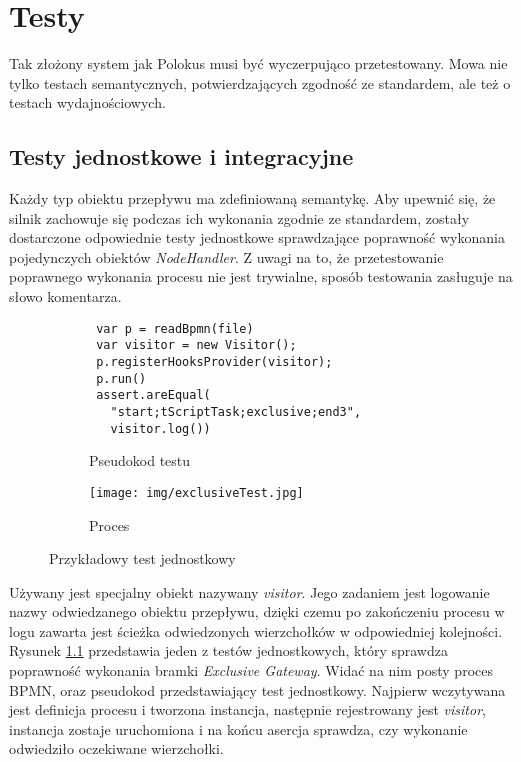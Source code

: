 \documentclass[declaration,shortabstract,mgr]{iithesis}
\newcommand{\bpmnnospace}{BPMN}
\begin{document}
\chapter{Testy}\label{chapter-tests}
Tak złożony system jak Polokus musi być wyczerpująco przetestowany. Mowa nie tylko testach semantycznych, potwierdzających zgodność ze standardem, ale też o testach wydajnościowych.

\section{Testy jednostkowe i integracyjne}
Każdy typ obiektu przepływu ma zdefiniowaną semantykę. Aby upewnić się, że silnik zachowuje się podczas ich wykonania zgodnie ze standardem, zostały dostarczone odpowiednie testy jednostkowe sprawdzające poprawność wykonania pojedynczych obiektów \textit{NodeHandler}. Z uwagi na to, że przetestowanie poprawnego wykonania procesu nie jest trywialne, sposób testowania zasługuje na słowo komentarza.
\begin{figure}[H]
     \centering
     \begin{subfigure}[b]{0.59\textwidth}
\begin{minipage}[c]{\textwidth}
\centering
\begin{lstlisting}
 var p = readBpmn(file)
 var visitor = new Visitor();
 p.registerHooksProvider(visitor);
 p.run()
 assert.areEqual(
   "start;tScriptTask;exclusive;end3",
   visitor.log())
\end{lstlisting}
\end{minipage}
        \caption{Pseudokod testu}
     \end{subfigure}
     \hfill
     \begin{subfigure}[b]{0.39\textwidth}
         \centering
         \texttt{[image: img/exclusiveTest.jpg]}
        \caption{Proces}
     \end{subfigure}
        \caption{Przykładowy test jednostkowy}
        \label{fig:unit-test}
\end{figure}



Używany jest specjalny obiekt nazywany \textit{visitor}. Jego zadaniem jest logowanie nazwy odwiedzanego obiektu przepływu, dzięki czemu po zakończeniu procesu w logu zawarta jest ścieżka odwiedzonych wierzchołków w odpowiedniej kolejności. Rysunek \ref{fig:unit-test} przedstawia jeden z testów jednostkowych, który sprawdza poprawność wykonania bramki \textit{Exclusive Gateway}. Widać na nim posty proces \bpmnnospace, oraz pseudokod przedstawiający test jednostkowy. Najpierw wczytywana jest definicja procesu i tworzona instancja, następnie rejestrowany jest \textit{visitor}, instancja zostaje uruchomiona i na końcu asercja sprawdza, czy wykonanie odwiedziło oczekiwane wierzchołki.
\end{document}
